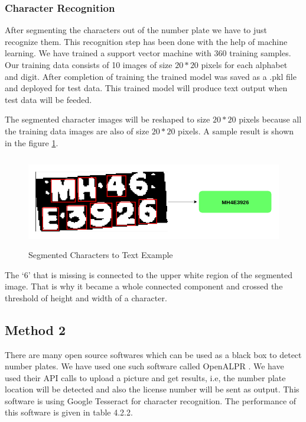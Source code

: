  
\subsubsection{Character Recognition}
After segmenting the characters out of the number plate we have to just recognize them. This recognition step has been done with the help of machine learning. We have trained a support vector machine with 360 training samples. Our training data consists of 10 images of size $20*20$ pixels for each alphabet and digit. After completion of training the trained model was saved as a .pkl file and deployed for test data. This trained model will produce text output when test data will be feeded. 
\par The segmented character images will be reshaped to size $20*20$ pixels because all the training data images are also of size $20*20$ pixels. A sample result is shown in the figure \ref{fig10}.

\begin{figure}[!htb]
\centerline{\includegraphics[height=40mm,width=140mm]{img/rd10.png}}
\caption{Segmented Characters to Text Example}
\label{fig10}
\end{figure}

\par The `6' that is missing is connected to the upper white region of the segmented image. That is why it became a whole connected component and crossed the threshold of height and width of a character.
 

\subsection{Method 2}

There are many open source softwares which can be used as a black box to detect number plates. We have used one such software called OpenALPR \cite{b0}. We have used their API calls to upload a picture and get results, i.e, the number plate location will be detected and also the license number will be sent as output. This software is using Google Tesseract \cite{b12} for character recognition. The performance of this software is given in table 4.2.2.






